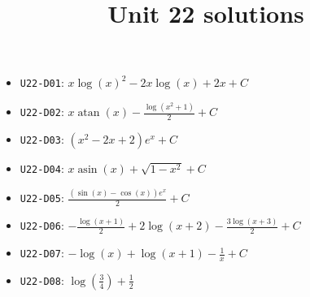 \title{Unit 22 solutions}\maketitle\begin{itemize}
  \item \texttt{U22-D01}: $x \log{\left(x \right)}^{2} - 2 x \log{\left(x \right)} + 2 x+C$
  \item \texttt{U22-D02}: $x \operatorname{atan}{\left(x \right)} - \frac{\log{\left(x^{2} + 1 \right)}}{2}+C$
  \item \texttt{U22-D03}: $\left(x^{2} - 2 x + 2\right) e^{x}+C$
  \item \texttt{U22-D04}: $x \operatorname{asin}{\left(x \right)} + \sqrt{1 - x^{2}}+C$
  \item \texttt{U22-D05}: $\frac{\left(\sin{\left(x \right)} - \cos{\left(x \right)}\right) e^{x}}{2}+C$
  \item \texttt{U22-D06}: $- \frac{\log{\left(x + 1 \right)}}{2} + 2 \log{\left(x + 2 \right)} - \frac{3 \log{\left(x + 3 \right)}}{2}+C$
  \item \texttt{U22-D07}: $- \log{\left(x \right)} + \log{\left(x + 1 \right)} - \frac{1}{x}+C$
  \item \texttt{U22-D08}: $\log{\left(\frac{3}{4} \right)} + \frac{1}{2}$
\end{itemize}

